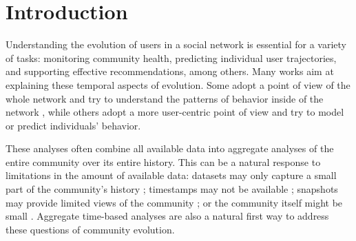 
\section{Introduction}

Understanding the evolution of users in a social network is essential for a variety of tasks: monitoring community health, predicting individual user trajectories, and supporting effective recommendations, among others.  Many works aim at explaining these temporal aspects of evolution. Some adopt a point of view of the whole network and try to understand the patterns of behavior inside of the network \cite{Zhu2014, Kooti2010}, while others adopt a more user-centric point of view and try to model \cite{Correa2010, Priedhorsky2007, Panciera2009, Welser2011a} or predict \cite{Danescu-niculescu-mizil2013} individuals' behavior.


These analyses often combine all available data into aggregate analyses of the entire community over its entire history.  This can be a natural response to limitations in the amount of available data: datasets may only capture a small part of the community's history \cite{}; timestamps may not be available \cite{}; snapshots may provide limited views of the community \cite{}; or the community itself might be small \cite{Lewis2008}.  Aggregate time-based analyses are also a natural first way to address these questions of community evolution.

